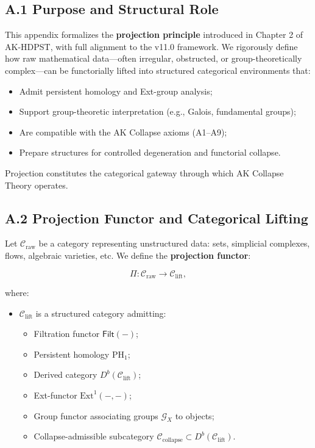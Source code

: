 \documentclass[11pt]{article}
\begin{document}
\subsection*{A.1 Purpose and Structural Role}

This appendix formalizes the \textbf{projection principle} introduced in Chapter 2 of AK-HDPST, with full alignment to the v11.0 framework. We rigorously define how raw mathematical data—often irregular, obstructed, or group-theoretically complex—can be functorially lifted into structured categorical environments that:

\begin{itemize}
    \item Admit persistent homology and Ext-group analysis;
    \item Support group-theoretic interpretation (e.g., Galois, fundamental groups);
    \item Are compatible with the AK Collapse axioms (A1–A9);
    \item Prepare structures for controlled degeneration and functorial collapse.
\end{itemize}

Projection constitutes the categorical gateway through which AK Collapse Theory operates.

\subsection*{A.2 Projection Functor and Categorical Lifting}

Let \( \mathcal{C}_{\mathrm{raw}} \) be a category representing unstructured data: sets, simplicial complexes, flows, algebraic varieties, etc. We define the \textbf{projection functor}:

\[
\Pi : \mathcal{C}_{\mathrm{raw}} \longrightarrow \mathcal{C}_{\mathrm{lift}},
\]

where:

\begin{itemize}
    \item \( \mathcal{C}_{\mathrm{lift}} \) is a structured category admitting:
    \begin{itemize}
        \item Filtration functor \( \mathsf{Filt}(-) \);
        \item Persistent homology \( \mathrm{PH}_1 \);
        \item Derived category \( D^b(\mathcal{C}_{\mathrm{lift}}) \);
        \item Ext-functor \( \mathrm{Ext}^1(-, -) \);
        \item Group functor associating groups \( \mathcal{G}_X \) to objects;
        \item Collapse-admissible subcategory \( \mathcal{C}_{\mathrm{collapse}} \subset D^b(\mathcal{C}_{\mathrm{lift}}) \).
    \end{itemize}
\end{itemize}
\end{document}
